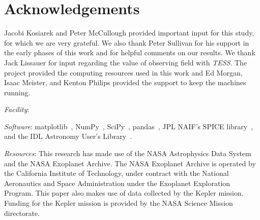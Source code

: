 \section*{Acknowledgements}
Jacobi Kosiarek and Peter McCullough provided important input for this study, for which we are very grateful. We also thank Peter Sullivan for his support in the early phases of this work and for helpful comments on our results.
We thank Jack Lissauer for input regarding the value of observing \keplers field with \textit{TESS}.
The \tess project provided the computing resources used in this work and Ed Morgan, Isaac Meister, and Kenton Philips provided the support to keep the machines running.

\vspace{0.5cm}
\textit{Facility}: \tess

\textit{Software}: matplotlib~\citep{hunter_matplotlib_2007}, NumPy~\citep{walt_numpy_2011}, SciPy~\citep{jones_scipy_2001}, pandas~\citep{mckinneypandas}, JPL NAIF's SPICE library~\citep{acton_SPICE_1996}, and the IDL Astronomy User's Library~\citep{landsman_idl_1995}.

\textit{Resources}: This research has made use of the NASA Astrophysics Data System and the NASA Exoplanet Archive. The NASA Exoplanet Archive is operated by the California Institute of Technology, under contract with the National Aeronautics and Space Administration under the Exoplanet Exploration Program.
This paper also makes use of data collected by the Kepler mission. Funding for the Kepler mission is provided by the NASA Science Mission directorate.
